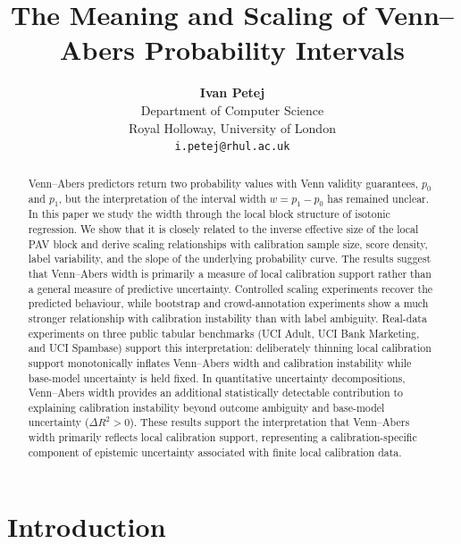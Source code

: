 \documentclass[11pt]{article}
\title{\textbf{The Meaning and Scaling of Venn--Abers Probability Intervals}}
\author{\textbf{Ivan Petej} \\
	\small Department of Computer Science \\
	\small Royal Holloway, University of London \\
	\small \texttt{i.petej@rhul.ac.uk}
}
\date{}
\begin{document}
	\maketitle
	
	\begin{abstract}
		Venn--Abers predictors return two probability values with Venn validity guarantees, $p_0$ and $p_1$, but the interpretation of the interval width $w=p_1-p_0$ has remained unclear. In this paper we study the width through the local block structure of isotonic regression. We show that it is closely related to the inverse effective size of the local PAV block and derive scaling relationships with calibration sample size, score density, label variability, and the slope of the underlying probability curve. The results suggest that Venn--Abers width is primarily a measure of local calibration support rather than a general measure of predictive uncertainty. Controlled scaling experiments recover the predicted behaviour, while bootstrap and crowd-annotation experiments show a much stronger relationship with calibration instability than with label ambiguity. Real-data experiments on three public tabular benchmarks (UCI Adult, UCI Bank Marketing, and UCI Spambase) support this interpretation: deliberately thinning local calibration support monotonically inflates Venn--Abers width and calibration instability while base-model uncertainty is held fixed. In quantitative uncertainty decompositions, Venn--Abers width provides an additional statistically detectable contribution to explaining calibration instability beyond outcome ambiguity and base-model uncertainty ($\Delta R^2 > 0$). These results support the interpretation that Venn--Abers width primarily reflects local calibration support, representing a calibration-specific component of epistemic uncertainty associated with finite local calibration data.
	\end{abstract}

\section{Introduction}
	\label{sec:intro}
\end{document}
